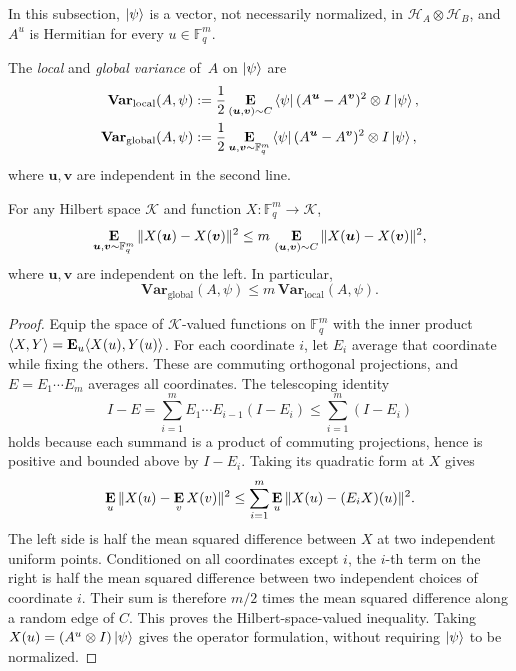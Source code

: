\documentclass[11pt]{article}
\theoremstyle{definition}
\newcommand{\E}{\mathop{\bf E\/}}
\newcommand{\F}{\mathbb F}
\newcommand{\calH}{\mathcal{H}}
\newcommand{\bu}{\boldsymbol{u}}
\newcommand{\bv}{\boldsymbol{v}}
\begin{document}
In this subsection, $\ket\psi$ is a vector, not necessarily normalized,
in $\calH_A\otimes\calH_B$, and $A^u$ is Hermitian for every
$u\in\F_q^m$.

\begin{definition}\label{def:local-and-variance}
The \emph{local} and \emph{global variance} of~$A$ on $\ket\psi$ are
\begin{align*}
 \mathbf{Var}_{\mathrm{local}}(A,\psi)
 &:=\frac12\E_{(\bu,\bv)\sim C}
   \bra\psi(A^{\bu}-A^{\bv})^2\otimes I\ket\psi,\\
 \mathbf{Var}_{\mathrm{global}}(A,\psi)
 &:=\frac12\E_{\bu,\bv\sim\F_q^m}
   \bra\psi(A^{\bu}-A^{\bv})^2\otimes I\ket\psi,
\end{align*}
where $\bu,\bv$ are independent in the second line.
\end{definition}

\begin{lemma}\label{lem:local-to-global}
For any Hilbert space $\mathcal{K}$ and function $X:\F_q^m\to\mathcal{K}$,
\[
 \E_{\bu,\bv\sim\F_q^m}\|X(\bu)-X(\bv)\|^2
 \leq m\,\E_{(\bu,\bv)\sim C}\|X(\bu)-X(\bv)\|^2,
\]
where $\bu,\bv$ are independent on the left.  In particular,
\[
 \mathbf{Var}_{\mathrm{global}}(A,\psi)
 \leq m\,\mathbf{Var}_{\mathrm{local}}(A,\psi).
\]
\end{lemma}

\begin{proof}
Equip the space of $\mathcal{K}$-valued functions on $\F_q^m$ with the inner product
$\langle X,Y\rangle=\E_u\langle X(u),Y(u)\rangle$.
For each coordinate $i$, let $E_i$ average that coordinate while
fixing the others.  These are commuting orthogonal projections, and
$E=E_1\cdots E_m$ averages all coordinates.  The telescoping identity
\[
 I-E=\sum_{i=1}^m E_1\cdots E_{i-1}(I-E_i)
 \leq\sum_{i=1}^m(I-E_i)
\]
holds because each summand is a product of commuting projections,
hence is positive and bounded above by $I-E_i$.  Taking its quadratic
form at $X$ gives
\[
 \E_u\|X(u)-\E_vX(v)\|^2
 \leq\sum_{i=1}^m\E_u\|X(u)-(E_iX)(u)\|^2.
\]
The left side is half the mean squared difference between $X$ at
two independent uniform points.  Conditioned on all coordinates
except $i$, the $i$-th term on the right is half the mean squared
difference between two independent choices of coordinate $i$.
Their sum is therefore $m/2$ times the mean squared difference
along a random edge of $C$.  This proves the Hilbert-space-valued
inequality.  Taking $X(u)=(A^u\otimes I)\ket\psi$ gives the operator
formulation, without requiring $\ket\psi$ to be normalized.
\end{proof}
\end{document}
